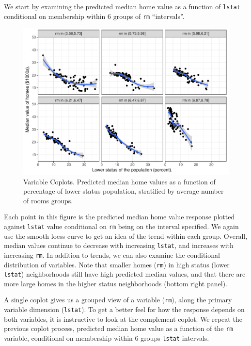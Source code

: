 \documentclass[article]{jss}
\begin{document}
We start by examining the predicted median home value as a function of
\texttt{lstat} conditional on membership within 6 groups of \texttt{rm}
``intervals''.

\begin{CodeChunk}
\begin{figure}

{\centering \includegraphics{Regression-rfsrc_files/figure-latex/coplots-1} 

}

\caption[Variable Coplots]{Variable Coplots. Predicted median home values as a function of percentage of lower status population, stratified by average number of rooms groups.}\label{fig:coplots}
\end{figure}
\end{CodeChunk}

Each point in this figure is the predicted median home value response
plotted against \texttt{lstat} value conditional on \texttt{rm} being on
the interval specified. We again use the smooth loess curve to get an
idea of the trend within each group. Overall, median values continue to
decrease with increasing \texttt{lstat}, and increases with increasing
\texttt{rm}. In addition to trends, we can also examine the conditional
distribution of variables. Note that smaller homes (\texttt{rm}) in high
status (lower \texttt{lstat}) neighborhoods still have high predicted
median values, and that there are more large homes in the higher status
neighborhoods (bottom right panel).

A single coplot gives us a grouped view of a variable (\texttt{rm}),
along the primary variable dimension (\texttt{lstat}). To get a better
feel for how the response depends on both variables, it is instructive
to look at the complement coplot. We repeat the previous coplot process,
predicted median home value as a function of the \texttt{rm} variable,
conditional on membership within 6 groups \texttt{lstat} intervals.
\end{document}

